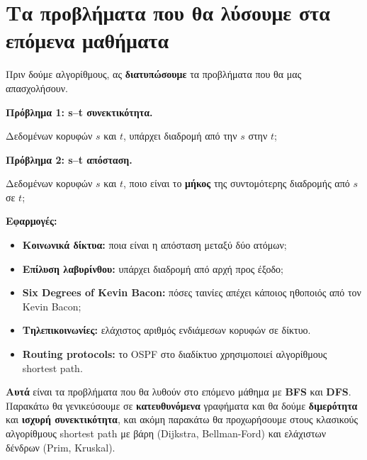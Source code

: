 \documentclass[11pt,a4paper]{article}
\begin{document}
\section{Τα προβλήματα που θα λύσουμε στα επόμενα μαθήματα}

Πριν δούμε αλγορίθμους, ας \textbf{διατυπώσουμε} τα προβλήματα που θα μας
απασχολήσουν.

\textbf{Πρόβλημα 1: s--t συνεκτικότητα.}
\begin{quoteblock}
Δεδομένων κορυφών $s$ και $t$, υπάρχει διαδρομή από την $s$ στην $t$;
\end{quoteblock}

\textbf{Πρόβλημα 2: s--t απόσταση.}
\begin{quoteblock}
Δεδομένων κορυφών $s$ και $t$, ποιο είναι το \textbf{μήκος} της συντομότερης
διαδρομής από $s$ σε $t$;
\end{quoteblock}

\textbf{Εφαρμογές:}
\begin{itemize}
  \item \textbf{Κοινωνικά δίκτυα:} ποια είναι η απόσταση μεταξύ δύο ατόμων;
  \item \textbf{Επίλυση λαβυρίνθου:} υπάρχει διαδρομή από αρχή προς έξοδο;
  \item \textbf{Six Degrees of Kevin Bacon:} πόσες ταινίες απέχει κάποιος
  ηθοποιός από τον Kevin Bacon;
  \item \textbf{Τηλεπικοινωνίες:} ελάχιστος αριθμός ενδιάμεσων κορυφών σε
  δίκτυο.
  \item \textbf{Routing protocols:} το OSPF στο διαδίκτυο χρησιμοποιεί
  αλγορίθμους shortest path.
\end{itemize}

\begin{keypoint}
\textbf{Αυτά} είναι τα προβλήματα που θα λυθούν στο επόμενο μάθημα με
\textbf{BFS} και \textbf{DFS}. Παρακάτω θα γενικεύσουμε σε \textbf{κατευθυνόμενα}
γραφήματα και θα δούμε \textbf{διμερότητα} και \textbf{ισχυρή συνεκτικότητα}, και
ακόμη παρακάτω θα προχωρήσουμε στους κλασικούς αλγορίθμους shortest path με βάρη
(Dijkstra, Bellman-Ford) και ελάχιστων δένδρων (Prim, Kruskal).
\end{keypoint}
\end{document}
